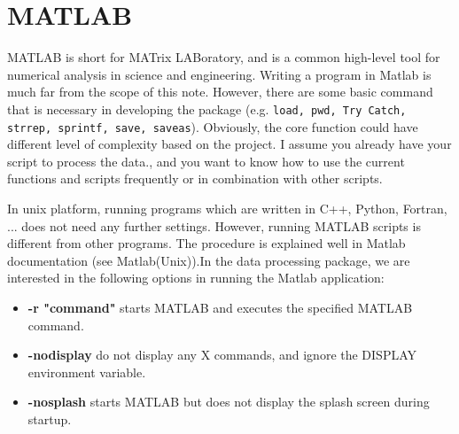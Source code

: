 \section{MATLAB\textsuperscript{\textregistered}}

MATLAB\textsuperscript{\textregistered} is short for MATrix LABoratory, and is a common high-level tool for numerical analysis in science and engineering. Writing a program in Matlab is much far from the scope of this note. However, there are some basic command that is necessary in developing the package (e.g. \texttt{load, pwd, Try Catch, strrep, sprintf, save, saveas}). Obviously, the core function could have different level of complexity based on the project. I assume you already have your script to process the data., and you want to know how to use the current functions and scripts frequently or in combination with other scripts.  





\noindent
In unix platform, running programs which are written in C++, Python, Fortran, ... does not need any further settings. However, running MATLAB\textsuperscript{\textregistered} scripts is different from other programs. The procedure is explained well in Matlab documentation (see Matlab(Unix)).In the data processing package,  we are interested in the following options in running the Matlab application:

\begin{itemize}
  \item   \textbf{-r "command"} starts MATLAB and executes the specified MATLAB command.
    \item \textbf{-nodisplay} do not display any X commands, and ignore the DISPLAY environment variable.
  \item   \textbf{-nosplash} starts MATLAB but does not display the splash screen during startup. 
\end{itemize}

